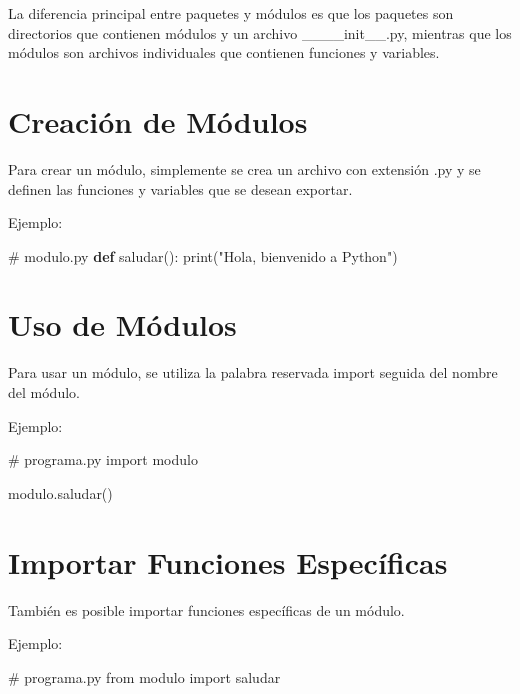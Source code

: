 \documentclass[
  a4paper,
  DIV=11,
  numbers=noendperiod,
  onepage,
  openany]{scrreprt}
\newenvironment{Shaded}{\begin{snugshade}}{\end{snugshade}}
\newcommand{\BuiltInTok}[1]{\textcolor[rgb]{0.00,0.23,0.31}{#1}}
\newcommand{\CommentTok}[1]{\textcolor[rgb]{0.37,0.37,0.37}{#1}}
\newcommand{\ImportTok}[1]{\textcolor[rgb]{0.00,0.46,0.62}{#1}}
\newcommand{\KeywordTok}[1]{\textcolor[rgb]{0.00,0.23,0.31}{\textbf{#1}}}
\newcommand{\NormalTok}[1]{\textcolor[rgb]{0.00,0.23,0.31}{#1}}
\newcommand{\StringTok}[1]{\textcolor[rgb]{0.13,0.47,0.30}{#1}}
\begin{document}
\begin{tcolorbox}
\begin{tcolorbox}
La diferencia principal entre paquetes y módulos es que los paquetes son
directorios que contienen módulos y un archivo \_\_\_\_init\_\_.py,
mientras que los módulos son archivos individuales que contienen
funciones y variables.

\end{tcolorbox}

\section{Creación de Módulos}\label{creaciuxf3n-de-muxf3dulos}

Para crear un módulo, simplemente se crea un archivo con extensión .py y
se definen las funciones y variables que se desean exportar.

Ejemplo:

\begin{Shaded}
\begin{Highlighting}[]
\CommentTok{\# modulo.py}
\KeywordTok{def}\NormalTok{ saludar():}
    \BuiltInTok{print}\NormalTok{(}\StringTok{"Hola, bienvenido a Python"}\NormalTok{)}
\end{Highlighting}
\end{Shaded}

\section{Uso de Módulos}\label{uso-de-muxf3dulos}

Para usar un módulo, se utiliza la palabra reservada import seguida del
nombre del módulo.

Ejemplo:

\begin{Shaded}
\begin{Highlighting}[]
\CommentTok{\# programa.py}
\ImportTok{import}\NormalTok{ modulo}

\NormalTok{modulo.saludar()}
\end{Highlighting}
\end{Shaded}

\section{Importar Funciones
Específicas}\label{importar-funciones-especuxedficas}

También es posible importar funciones específicas de un módulo.

Ejemplo:

\begin{Shaded}
\begin{Highlighting}[]
\CommentTok{\# programa.py}
\ImportTok{from}\NormalTok{ modulo }\ImportTok{import}\NormalTok{ saludar}


\end{Highlighting}
\end{Shaded}
\end{tcolorbox}
\end{document}
